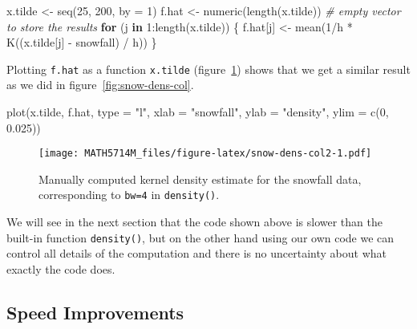 \documentclass[
  a4paper,
]{article}
\newenvironment{Shaded}{\begin{snugshade}}{\end{snugshade}}
\newcommand{\AttributeTok}[1]{\textcolor[rgb]{0.77,0.63,0.00}{#1}}
\newcommand{\CommentTok}[1]{\textcolor[rgb]{0.56,0.35,0.01}{\textit{#1}}}
\newcommand{\ControlFlowTok}[1]{\textcolor[rgb]{0.13,0.29,0.53}{\textbf{#1}}}
\newcommand{\DecValTok}[1]{\textcolor[rgb]{0.00,0.00,0.81}{#1}}
\newcommand{\FloatTok}[1]{\textcolor[rgb]{0.00,0.00,0.81}{#1}}
\newcommand{\FunctionTok}[1]{\textcolor[rgb]{0.00,0.00,0.00}{#1}}
\newcommand{\NormalTok}[1]{#1}
\newcommand{\OtherTok}[1]{\textcolor[rgb]{0.56,0.35,0.01}{#1}}
\newcommand{\SpecialCharTok}[1]{\textcolor[rgb]{0.00,0.00,0.00}{#1}}
\newcommand{\StringTok}[1]{\textcolor[rgb]{0.31,0.60,0.02}{#1}}
\theoremstyle{definition}
\theoremstyle{definition}
\theoremstyle{definition}
\theoremstyle{definition}
\theoremstyle{remark}
\begin{document}
\begin{Shaded}
\begin{Highlighting}[]
\NormalTok{x.tilde }\OtherTok{\textless{}{-}} \FunctionTok{seq}\NormalTok{(}\DecValTok{25}\NormalTok{, }\DecValTok{200}\NormalTok{, }\AttributeTok{by =} \DecValTok{1}\NormalTok{)}
\NormalTok{f.hat }\OtherTok{\textless{}{-}} \FunctionTok{numeric}\NormalTok{(}\FunctionTok{length}\NormalTok{(x.tilde)) }\CommentTok{\# empty vector to store the results}
\ControlFlowTok{for}\NormalTok{ (j }\ControlFlowTok{in} \DecValTok{1}\SpecialCharTok{:}\FunctionTok{length}\NormalTok{(x.tilde)) \{}
\NormalTok{  f.hat[j] }\OtherTok{\textless{}{-}} \FunctionTok{mean}\NormalTok{(}\DecValTok{1}\SpecialCharTok{/}\NormalTok{h }\SpecialCharTok{*} \FunctionTok{K}\NormalTok{((x.tilde[j] }\SpecialCharTok{{-}}\NormalTok{ snowfall) }\SpecialCharTok{/}\NormalTok{ h))}
\NormalTok{\}}
\end{Highlighting}
\end{Shaded}

Plotting \texttt{f.hat} as a function \texttt{x.tilde} (figure~\ref{fig:snow-dens-col2}) shows that we get a similar result
as we did in figure~\ref{fig:snow-dens-col}.



\begin{Shaded}
\begin{Highlighting}[]
\FunctionTok{plot}\NormalTok{(x.tilde, f.hat, }\AttributeTok{type =} \StringTok{"l"}\NormalTok{,}
     \AttributeTok{xlab =} \StringTok{"snowfall"}\NormalTok{, }\AttributeTok{ylab =} \StringTok{"density"}\NormalTok{,}
     \AttributeTok{ylim =} \FunctionTok{c}\NormalTok{(}\DecValTok{0}\NormalTok{, }\FloatTok{0.025}\NormalTok{))}
\end{Highlighting}
\end{Shaded}

\begin{figure}
\centering
\texttt{[image: MATH5714M\_files/figure-latex/snow-dens-col2-1.pdf]}
\caption{\label{fig:snow-dens-col2}Manually computed kernel density estimate for the snowfall data, corresponding to \texttt{bw=4} in \texttt{density()}.}
\end{figure}

We will see in the next section that the code shown above is slower than
the built-in function \texttt{density()}, but on the other hand using our own code
we can control all details of the computation and there is no uncertainty
about what exactly the code does.

\hypertarget{speed-improvements}{%
\subsection*{Speed Improvements}\label{speed-improvements}}
\end{document}
